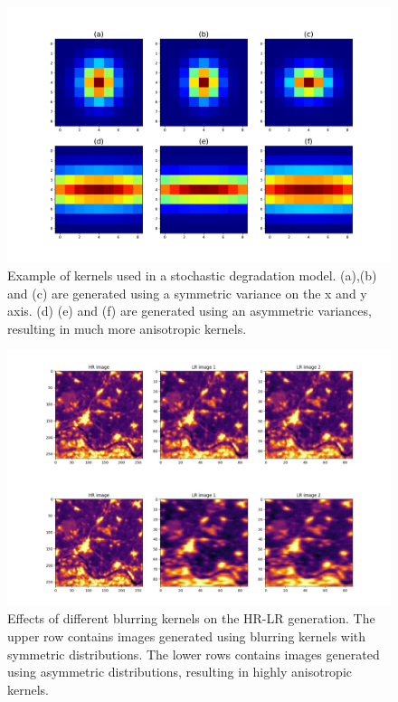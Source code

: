         \begin{figure}[H]
                \centering
                \includegraphics[width=\linewidth]{Includes/4-degradation_kernels.pdf}
                \caption{Example of kernels used in a stochastic degradation model. (a),(b) and (c) are generated using a symmetric variance on the x and y axis. (d) (e) and (f) are generated using an asymmetric variances, resulting in much more anisotropic kernels.}
                \label{fig:4-degradation_kernels}
            \end{figure}

        \begin{figure}[H]
                \centering
                \includegraphics[width=\linewidth]{Includes/4-degradation-kernel-examples.pdf}
                \caption{Effects of different blurring kernels on the HR-LR generation. The upper row contains images generated using blurring kernels with symmetric distributions. The lower rows contains images generated using asymmetric distributions, resulting in highly anisotropic kernels.}
                \label{fig:4-degradation-kernel-examples}
            \end{figure}
            
